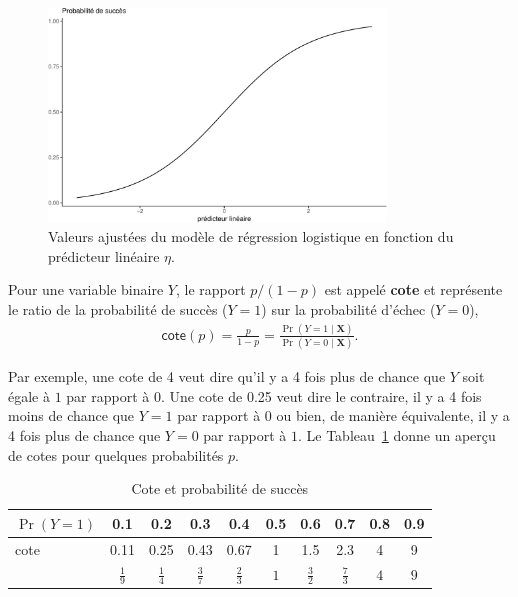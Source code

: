 \documentclass[
  11pt,
  letterpaper,
]{scrbook}
\theoremstyle{definition}
\theoremstyle{remark}
\begin{document}
\begin{figure}[ht!]

{\centering \includegraphics[width=0.8\textwidth,height=\textheight]{./05-reglogistique_files/figure-pdf/fig-logitplot-1.pdf}

}

\caption{\label{fig-logitplot}Valeurs ajustées du modèle de régression
logistique en fonction du prédicteur linéaire \(\eta\).}

\end{figure}

Pour une variable binaire \(Y\), le rapport \(p/(1-p)\) est appelé
\textbf{cote} et représente le ratio de la probabilité de succès
(\(Y=1\)) sur la probabilité d'échec (\(Y=0\)), \begin{align*}
 \mathsf{cote}(p) = \frac{p}{1-p} = \frac{\Pr(Y=1 \mid \mathbf{X})}{\Pr(Y=0 \mid \mathbf{X})}.
\end{align*}

Par exemple, une cote de 4 veut dire qu'il y a 4 fois plus de chance que
\(Y\) soit égale à \(1\) par rapport à \(0\). Une cote de 0.25 veut dire
le contraire, il y a 4 fois moins de chance que \(Y=1\) par rapport à
\(0\) ou bien, de manière équivalente, il y a 4 fois plus de chance que
\(Y=0\) par rapport à \(1\). Le Tableau~\ref{tbl-cotes} donne un aperçu
de cotes pour quelques probabilités \(p\).

\hypertarget{tbl-cotes}{}
\begin{table}
\caption{\label{tbl-cotes}Cote et probabilité de succès }\tabularnewline

\centering
\begin{tabular}{lccccccccc}
\toprule
\(\Pr(Y=1)\) & 0.1 & 0.2 & 0.3 & 0.4 & 0.5 & 0.6 & 0.7 & 0.8 & 0.9\\
\midrule
cote & 0.11 & 0.25 & 0.43 & 0.67 & 1 & 1.5 & 2.3 & 4 & 9\\
 & \(\frac{1}{9}\) & \(\frac{1}{4}\) & \(\frac{3}{7}\) & \(\frac{2}{3}\) & \(1\) & \(\frac{3}{2}\) & \(\frac{7}{3}\) & \(4\) & \(9\)\\
\bottomrule
\end{tabular}
\end{table}
\end{document}
